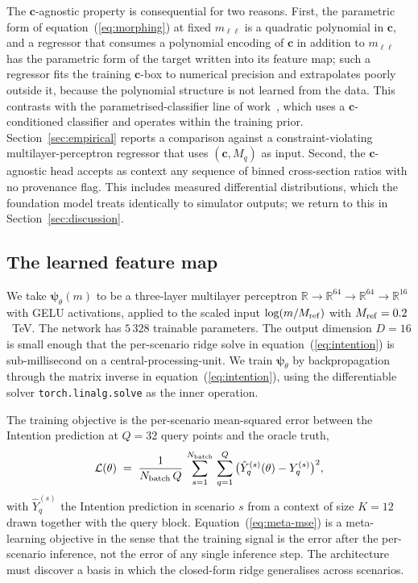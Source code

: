 \documentclass[11pt,a4paper]{article}
\newcommand{\mll}{m_{\ell\ell}}
\newcommand{\psib}{\bm{\psi}}
\newcommand{\Mref}{M_{\rm ref}}
\begin{document}
The $\bm{c}$-agnostic property is consequential for two reasons. First, the parametric form of equation~(\ref{eq:morphing}) at fixed $\mll$ is a quadratic polynomial in $\bm{c}$, and a regressor that consumes a polynomial encoding of $\bm{c}$ in addition to $\mll$ has the parametric form of the target written into its feature map; such a regressor fits the training $\bm{c}$-box to numerical precision and extrapolates poorly outside it, because the polynomial structure is not learned from the data. This contrasts with the parametrised-classifier line of work~\cite{Chen:2022lcp,Brehmer:2018kdj,Brehmer:2019xox}, which uses a $\bm{c}$-conditioned classifier and operates within the training prior. Section~\ref{sec:empirical} reports a comparison against a constraint-violating multilayer-perceptron regressor that uses $(\bm{c}, M_q)$ as input. Second, the $\bm{c}$-agnostic head accepts as context any sequence of binned cross-section ratios with no provenance flag. This includes measured differential distributions, which the foundation model treats identically to simulator outputs; we return to this in Section~\ref{sec:discussion}.

\subsection{The learned feature map}
\label{sec:feature-map}

We take $\psib_\theta(m)$ to be a three-layer multilayer perceptron $\mathbb{R} \to \mathbb{R}^{64} \to \mathbb{R}^{64} \to \mathbb{R}^{16}$ with GELU activations, applied to the scaled input $\log(m / \Mref)$ with $\Mref = 0.2$~TeV. The network has $5\,328$ trainable parameters. The output dimension $D = 16$ is small enough that the per-scenario ridge solve in equation~(\ref{eq:intention}) is sub-millisecond on a central-processing-unit. We train $\psib_\theta$ by backpropagation through the matrix inverse in equation~(\ref{eq:intention}), using the differentiable solver \texttt{torch.linalg.solve} as the inner operation.

The training objective is the per-scenario mean-squared error between the Intention prediction at $Q = 32$ query points and the oracle truth,
\begin{equation}
  \mathcal{L}(\theta) \;=\; \frac{1}{N_{\rm batch}\,Q}\,\sum_{s=1}^{N_{\rm batch}}\,\sum_{q=1}^{Q}\,\bigl(\hat{Y}_q^{(s)}(\theta) - Y_q^{(s)}\bigr)^2,
  \label{eq:meta-mse}
\end{equation}
with $\hat{Y}_q^{(s)}$ the Intention prediction in scenario $s$ from a context of size $K = 12$ drawn together with the query block. Equation~(\ref{eq:meta-mse}) is a meta-learning objective in the sense that the training signal is the error after the per-scenario inference, not the error of any single inference step. The architecture must discover a basis in which the closed-form ridge generalises across scenarios.
\end{document}

